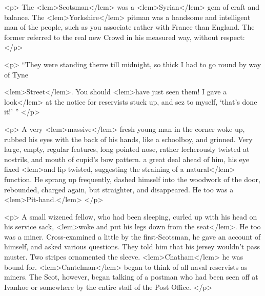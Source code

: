 {{				<p>
					The 
<lem>Scotsman</lem>
						{} 
					was a 
<lem>Syrian</lem>{} gem of craft and balance. The 
<lem>Yorkshire</lem>
						{} 
					pitman was a handsome 
					and intelligent man of the people, such as you associate rather with France 
					than England. The former referred to the real new Crowd in his measured way, without 
					respect: 
 				</p>

				<p>
					“They were standing therre till midnight, so thick I had to go round by way of Tyne 
					
<lem>Street</lem>{}. You should 
<lem>have just seen them! I gave a look</lem> 
						{}
					at the notice for reservists stuck up, 
					and sez to myself, `that's done it!' ” 
 				</p>

				<p>
					A very 
<lem>massive</lem>
						{} 
					fresh young man in the corner woke up, rubbed his eyes with 
					the back of his hands, like a schoolboy, and grinned. Very large, empty, regular 
					features, long pointed nose, rather lecherously twisted at nostrils, and mouth of 
					cupid's bow pattern. 
						{} 
					a great deal ahead of 
					him, his eye fixed 
<lem>and lip twisted, suggesting the straining of a natural</lem>
						{} 
					function. He sprang up frequently, dashed himself into the woodwork of the door, 
					rebounded, charged again, but straighter, and disappeared. He too was a 
<lem>Pit-hand.</lem>
						{} 
 				</p>

				<p>
					A small wizened fellow, who had been sleeping, curled up with his head on his service 
					sack, 
<lem>woke and put his legs down from the seat</lem>{}. 
					He too was a miner. Cross-examined a little by the first-Scotsman, 
					he gave an account of himself, and asked various questions. They told him that his 
					jersey wouldn't pass muster. Two stripes ornamented the sleeve. 
<lem>Chatham</lem>
						{} 
					he was bound 
					for. 
<lem>Cantelman</lem>
						{} 
					began to think of all naval reservists as miners. The Scot, however, 
					began talking of a postman who had been seen off at Ivanhoe or somewhere by the 
					entire staff of the Post Office. 
 				</p>

}}
